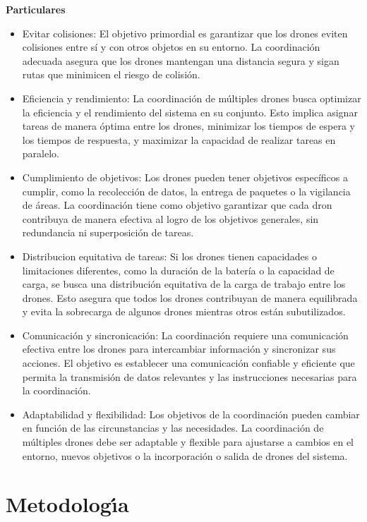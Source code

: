 \documentclass[11pt,epsf,times]{article}
\begin{document}
\bigskip
\noindent
\textbf{Particulares} \\
\begin{itemize}
\item Evitar colisiones: El objetivo primordial es garantizar que los drones eviten colisiones entre sí y con otros objetos en su entorno. La coordinación adecuada asegura que los drones mantengan una distancia segura y sigan rutas que minimicen el riesgo de colisión.
\item Eficiencia y rendimiento: La coordinación de múltiples drones busca optimizar la eficiencia y el rendimiento del sistema en su conjunto. Esto implica asignar tareas de manera óptima entre los drones, minimizar los tiempos de espera y los tiempos de respuesta, y maximizar la capacidad de realizar tareas en paralelo.
\item Cumplimiento de objetivos: Los drones pueden tener objetivos específicos a cumplir, como la recolección de datos, la entrega de paquetes o la vigilancia de áreas. La coordinación tiene como objetivo garantizar que cada dron contribuya de manera efectiva al logro de los objetivos generales, sin redundancia ni superposición de tareas.
\item Distribucion equitativa de tareas: Si los drones tienen capacidades o limitaciones diferentes, como la duración de la batería o la capacidad de carga, se busca una distribución equitativa de la carga de trabajo entre los drones. Esto asegura que todos los drones contribuyan de manera equilibrada y evita la sobrecarga de algunos drones mientras otros están subutilizados.
\item Comunicación y sincronicación: La coordinación requiere una comunicación efectiva entre los drones para intercambiar información y sincronizar sus acciones. El objetivo es establecer una comunicación confiable y eficiente que permita la transmisión de datos relevantes y las instrucciones necesarias para la coordinación.
\item Adaptabilidad y flexibilidad: Los objetivos de la coordinación pueden cambiar en función de las circunstancias y las necesidades. La coordinación de múltiples drones debe ser adaptable y flexible para ajustarse a cambios en el entorno, nuevos objetivos o la incorporación o salida de drones del sistema.
\end{itemize}

\section{Metodolog\'{\i}a}
\end{document}
